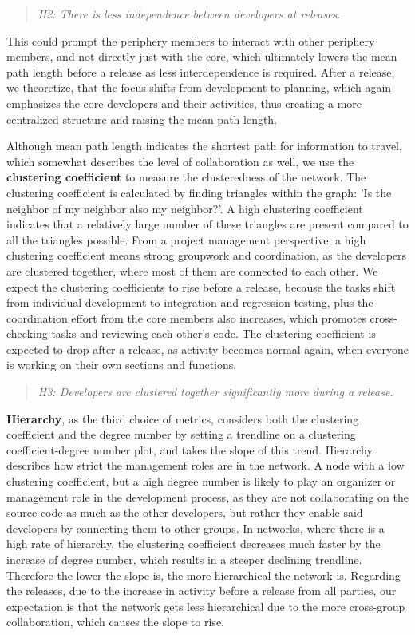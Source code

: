 \begin{quote}
    \textit{H2: There is less independence between developers at releases.}
\end{quote}

This could prompt the periphery members to interact with other periphery members, and not directly just with the core, which ultimately lowers the mean path length before a release as less interdependence is required. After a release, we theoretize, that the focus shifts from development to planning, which again emphasizes the core developers and their activities, thus creating a more centralized structure and raising the mean path length.

Although mean path length indicates the shortest path for information to travel, which somewhat describes the level of collaboration as well, we use the \textbf{clustering coefficient} to measure the clusteredness of the network. The clustering coefficient is calculated by finding triangles within the graph: 'Is the neighbor of my neighbor also my neighbor?'. A high clustering coefficient indicates that a relatively large number of these triangles are present compared to all the triangles possible. From a project management perspective, a high clustering coefficient means strong groupwork and coordination, as the developers are clustered together, where most of them are connected to each other. We expect the clustering coefficients to rise before a release, because the tasks shift from individual development to integration and regression testing, plus the coordination effort from the core members also increases, which promotes cross-checking tasks and reviewing each other's code. The clustering coefficient is expected to drop after a release, as activity becomes normal again, when everyone is working on their own sections and functions.


\begin{quote}
    \textit{H3: Developers are clustered together significantly more during a release.}
\end{quote}


\textbf{Hierarchy}, as the third choice of metrics, considers both the clustering coefficient and the degree number by setting a trendline on a clustering coefficient-degree number plot, and takes the slope of this trend. Hierarchy describes how strict the management roles are in the network. A node with a low clustering coefficient, but a high degree number is likely to play an organizer or management role in the development process, as they are not collaborating on the source code as much as the other developers, but rather they enable said developers by connecting them to other groups. In networks, where there is a high rate of hierarchy, the clustering coefficient decreases much faster by the increase of degree number, which results in a steeper declining trendline. Therefore the lower the slope is, the more hierarchical the network is. Regarding the releases, due to the increase in activity before a release from all parties, our expectation is that the network gets less hierarchical due to the more cross-group collaboration, which causes the slope to rise. 

